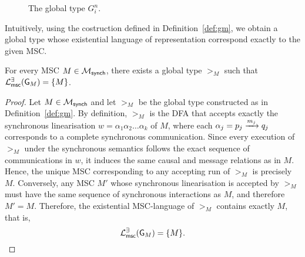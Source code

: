 \begin{definition}[$G_i^n$]
\begin{figure}[!ht]
		\caption{The global type $G_i^n$.}
		\label{fig:gni}
	\end{figure}

\end{definition}


Intuitively, using the costruction defined in Definition~\ref{def:gm},
we obtain a global type whose existential language of representation
correspond exactly to the given MSC. 

\bigskip

\begin{lemma}\label{lem:gm}
For every MSC $M \in \mscsetofmodel{\synchmodel}$,  
there exists a global type $\gt_M$ such that  
$\existentialmsclanguageof{\gt_M} = \{ M \}$.
\end{lemma}

\begin{proof}
Let $M \in \mscsetofmodel{\synchmodel}$ and let $\gt_M$ be the global type  
constructed as in Definition~\ref{def:gm}.  
By definition, $\gt_M$ is the DFA that accepts exactly  
the synchronous linearisation  
$w = \alpha_1 \alpha_2 \ldots \alpha_k$ of $M$,  
where each $\alpha_j = \marrow{p_j}{q_j}{m_j}$  
corresponds to a complete synchronous communication.  
Since every execution of $\gt_M$ under the synchronous semantics  
follows the exact sequence of communications in $w$,  
it induces the same causal and message relations as in $M$.  
Hence, the unique MSC corresponding to any accepting run of $\gt_M$  
is precisely $M$.  
Conversely, any MSC $M'$ whose synchronous linearisation is accepted  
by $\gt_M$ must have the same sequence of synchronous interactions as $M$,  
and therefore $M' = M$.  
Therefore, the existential MSC-language of $\gt_M$ contains exactly $M$,  
that is,
\[
    \existentialmsclanguageof{\gt_M} = \{ M \}.
\]
\end{proof}


